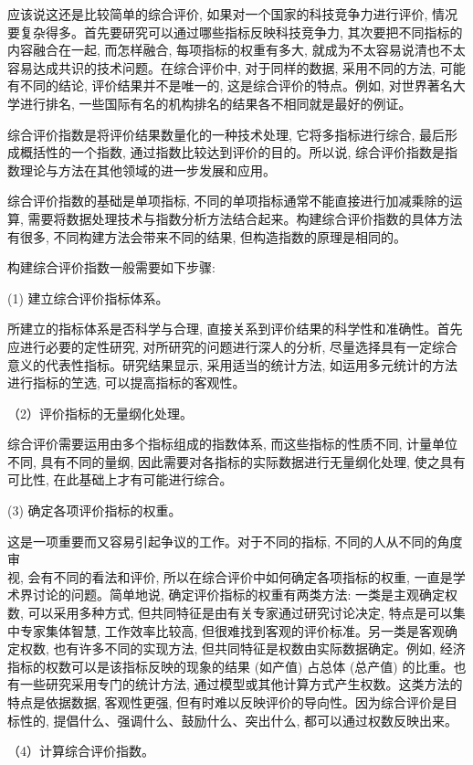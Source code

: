 \documentclass[10pt]{article}
\begin{document}
\begin{CJK*}{UTF8}{bsmi}
应该说这还是比较简单的综合评价, 如果对一个国家的科技竞争力进行评价, 情况要复杂得多。首先要研究可以通过哪些指标反映科技竞争力, 其次要把不同指标的内容融合在一起, 而怎样融合, 每项指标的权重有多大, 就成为不太容易说清也不太容易达成共识的技术问题。在综合评价中, 对于同样的数据, 采用不同的方法, 可能有不同的结论, 评价结果并不是唯一的, 这是综合评价的特点。例如, 对世界著名大学进行排名, 一些国际有名的机构排名的结果各不相同就是最好的例证。

综合评价指数是将评价结果数量化的一种技术处理, 它将多指标进行综合, 最后形成概括性的一个指数, 通过指数比较达到评价的目的。所以说, 综合评价指数是指数理论与方法在其他领域的进一步发展和应用。

综合评价指数的基础是单项指标, 不同的单项指标通常不能直接进行加减乘除的运算, 需要将数据处理技术与指数分析方法结合起来。构建综合评价指数的具体方法有很多, 不同构建方法会带来不同的结果, 但构造指数的原理是相同的。

构建综合评价指数一般需要如下步骤:

(1) 建立综合评价指标体系。

所建立的指标体系是否科学与合理, 直接关系到评价结果的科学性和准确性。首先应进行必要的定性研究, 对所研究的问题进行深人的分析, 尽量选择具有一定综合意义的代表性指标。研究结果显示, 采用适当的统计方法, 如运用多元统计的方法进行指标的笁选, 可以提高指标的客观性。

（2）评价指标的无量纲化处理。

综合评价需要运用由多个指标组成的指数体系, 而这些指标的性质不同, 计量单位不同, 具有不同的量纲, 因此需要对各指标的实际数据进行无量纲化处理, 使之具有可比性, 在此基础上才有可能进行综合。

(3) 确定各项评价指标的权重。

这是一项重要而又容易引起争议的工作。对于不同的指标, 不同的人从不同的角度审\\
视, 会有不同的看法和评价, 所以在综合评价中如何确定各项指标的权重, 一直是学术界讨论的问题。简单地说, 确定评价指标的权重有两类方法: 一类是主观确定权数, 可以采用多种方式, 但共同特征是由有关专家通过研究讨论决定, 特点是可以集中专家集体智慧, 工作效率比较高, 但很难找到客观的评价标准。另一类是客观确定权数, 也有许多不同的实现方法, 但共同特征是权数由实际数据确定。例如, 经济指标的权数可以是该指标反映的现象的结果 (如产值) 占总体 (总产值) 的比重。也有一些研究采用专门的统计方法, 通过模型或其他计算方式产生权数。这类方法的特点是依据数据, 客观性更强, 但有时难以反映评价的导向性。因为综合评价是目标性的, 提倡什么、强调什么、鼓励什么、突出什么, 都可以通过权数反映出来。

（4）计算综合评价指数。


\end{CJK*}
\end{document}
